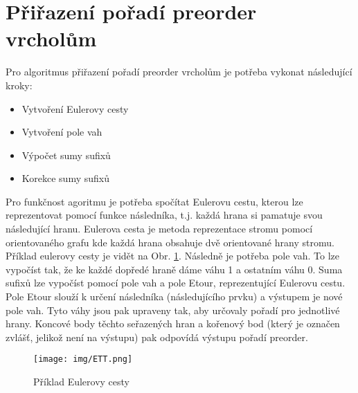 \documentclass[12pt,a4paper]{article}
\begin{document}

\section{Přiřazení pořadí preorder vrcholům}
\label{sec:preorder}
Pro algoritmus přiřazení pořadí preorder vrcholům je potřeba vykonat následující kroky:
\begin{itemize}
     \item Vytvoření Eulerovy cesty
     \item Vytvoření pole vah
     \item Výpočet sumy sufixů
     \item Korekce sumy sufixů
 \end{itemize}

Pro funkčnost agoritmu je potřeba spočítat Eulerovu cestu, kterou lze reprezentovat pomocí funkce následníka, t.j. každá hrana si pamatuje svou následující hranu. 
Eulerova cesta je metoda reprezentace stromu pomocí orientovaného grafu kde každá hrana obsahuje dvě orientované hrany stromu. 
Příklad eulerovy cesty je vidět na Obr. \ref{fig:ett}. 
Následně je potřeba pole vah. 
To lze vypočíst tak, že ke každé dopředé hraně dáme váhu 1 a ostatním váhu 0. 
Suma sufixů lze vypočíst pomocí pole vah a pole Etour, reprezentující Eulerovu cestu.
Pole Etour slouží k určení následníka (následujícího prvku) a výstupem je nové pole vah.
Tyto váhy jsou pak upraveny tak, aby určovaly pořadí pro jednotlivé hrany. 
Koncové body těchto seřazených hran a kořenový bod (který je označen zvlášť, jelikož není na výstupu) pak odpovídá výstupu pořadí preorder.

\begin{figure}[H]
    \centering
    \texttt{[image: img/ETT.png]}
    \caption{Příklad Eulerovy cesty}
    \label{fig:ett}
\end{figure}
\end{document}
